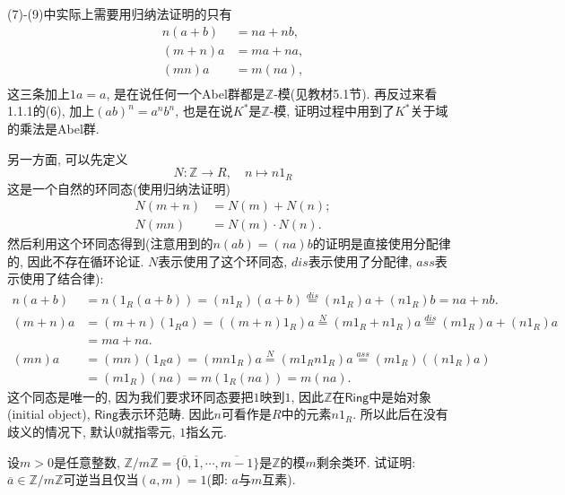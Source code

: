 \documentclass{../solutions-cn}
\begin{document}
\begin{remark}
    (7)-(9)中实际上需要用归纳法证明的只有
    \[
    \begin{aligned}
        n(a + b) &= na + nb,\\
        (m + n)a &= ma + na,\\
        (mn)a &= m(na),\\
    \end{aligned}
    \]
    这三条加上$1a = a$, 是在说任何一个Abel群都是$\mathbb{Z}$-模(见教材5.1节). 再反过来看1.1.1的(6), 加上$(ab)^n = a^nb^n$, 也是在说$K^*$是$\mathbb{Z}$-模, 证明过程中用到了$K^*$关于域的乘法是Abel群.
    
    另一方面, 可以先定义
    \[
        N: \mathbb{Z} \to R,\quad n \mapsto n1_R
    \]
    这是一个自然的环同态(使用归纳法证明)
    \[
    \begin{aligned}
        N(m + n) &= N(m) + N(n);\\
        N(mn) &= N(m) \cdot N(n).
    \end{aligned}
    \]
    然后利用这个环同态得到(注意用到的$n(ab) = (na)b$的证明是直接使用分配律的, 因此不存在循环论证. $N$表示使用了这个环同态, $dis$表示使用了分配律, $ass$表示使用了结合律):
    \[
    \begin{aligned}
        n(a + b) &= n(1_R(a + b)) = (n1_R)(a + b) \overset{dis}= (n1_R)a + (n1_R)b = na + nb.\\
        (m + n)a &= (m + n)(1_Ra) = ((m + n)1_R)a \overset{N}= (m1_R + n1_R)a \overset{dis}= (m1_R)a + (n1_R)a\\
        &= ma + na.\\
        (mn)a &= (mn)(1_Ra) = (mn1_R)a \overset{N}= (m1_Rn1_R)a \overset{ass}= (m1_R)((n1_R)a)\\
        &= (m1_R)(na) = m(1_R(na)) = m(na).
    \end{aligned}
    \]
    这个同态是唯一的, 因为我们要求环同态要把$1$映到$1$, 因此$\mathbb{Z}$在$\mathsf{Ring}$中是始对象(initial object), $\mathsf{Ring}$表示环范畴. 因此$n$可看作是$R$中的元素$n1_R$. 所以此后在没有歧义的情况下, 默认$0$就指零元, $1$指幺元.
\end{remark}

\begin{exercise}[习题1.2.9]
    设$m > 0$是任意整数, $\mathbb{Z}/m\mathbb{Z} = \{\overline{0}, \overline{1}, \cdots, \overline{m-1}\}$是$\mathbb{Z}$的模$m$剩余类环. 试证明: $\overline{a} \in \mathbb{Z}/m\mathbb{Z}$可逆当且仅当$(a, m) = 1$(即: $a$与$m$互素).
\end{exercise}
\end{document}
